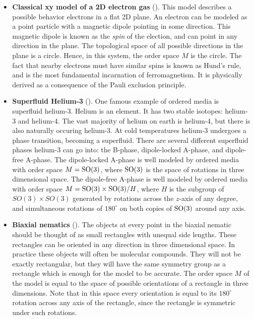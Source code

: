 \begin{itemize}
\item \textbf{Classical xy model of a 2D electron gas} (\cite{kosterlitz2018ordering}). This model describes a possible behavior electrons in a flat 2D plane. An electron can be modeled as a point particle with a magnetic dipole pointing in some direction. This magnetic dipole is known as the \textit{spin} of the election, and can point in any direction in the plane. The topological space of all possible directions in the plane is a circle. Hence, in this system, the order space $M$ is the circle. The fact that nearby electrons must have similar spins is known as Hund’s rule, and is the most fundamental incarnation of ferromagnetism. It is physically derived as a consequence of the Pauli exclusion principle.

\item \textbf{Superfluid Helium-3} (\cite{lee1997extraordinary}). One famous example of ordered media is superfluid helium-3. Helium is an element. It has two stable isotopes: helium-3 and helium-4. The vast majority of helium on earth is helium-4, but there is also naturally occuring helium-3. At cold temperatures helium-3 undergoes a phase transition, becoming a superfluid. There are several different superfluid phases helium-3 can go into: the B-phase, dipole-locked A-phase, and dipole-free A-phase. The dipole-locked A-phase is well modeled by ordered media with order space $M=\operatorname{SO}(3)$, where $\operatorname{SO}(3)$ is the space of rotations in three dimensional space. The dipole-free A-phase is well modeled by ordered media with order space $M=\operatorname{SO}(3)\times \operatorname{SO}(3)/H$, where $H$ is the subgroup of $SO(3)\times SO(3)$ generated by rotations across the $z$-axis of any degree, and simultaneous rotations of $180^\circ$ on both copies of $\operatorname{SO}(3)$ around any axis.

\item \textbf{Biaxial nematics} (\cite{ranganath1988defects}). The objects at every point in the biaxial nematic should be thought of as small rectangles with unequal side lengths. These rectangles can be oriented in any direction in three dimensional space. In practice these objects will often be molecular compounds. They will not be exactly rectangular, but they will have the same symmetry group as a rectangle which is enough for the model to be accurate. The order space $M$ of the model is equal to the space of possible orientations of a rectangle in three dimensions. Note that in this space every orientation is equal to its $180^\circ$ rotation across any axis of the rectangle, since the rectangle is symmetric under such rotations.
\end{itemize}

